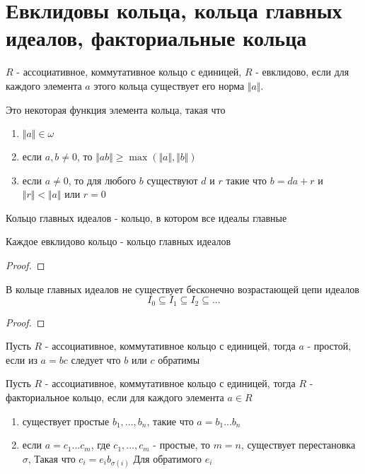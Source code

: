 \documentclass[../main/document.tex]{subfiles}
\begin{document}
\section{Евклидовы кольца, кольца главных идеалов, факториальные кольца}
\begin{dfn}
$R$ - ассоциативное, коммутативное кольцо с единицей, $R$ - евклидово, если для каждого элемента $a$ этого кольца существует его норма $\Vert a\Vert$.
\end{dfn}
\begin{dfn}
Это некоторая функция элемента кольца, такая что
\begin{enumerate}
\item $\Vert a\Vert \in \omega$
\item если $a,b\neq 0$, то $\Vert ab\Vert \geq \max(\Vert a\Vert,\Vert b\Vert)$
\item если $a\neq 0$, то для любого $b$ существуют $d$ и $r$ такие что $b=da+r$ и $\Vert r\Vert < \Vert a\Vert$ или $r=0$
\end{enumerate}
\end{dfn}
\begin{dfn}
Кольцо главных идеалов - кольцо, в котором все идеалы главные
\end{dfn}
\begin{thm}
Каждое евклидово кольцо - кольцо главных идеалов
\begin{proof}

\end{proof}
\end{thm}
\begin{thm}
В кольце главных идеалов не существует бесконечно возрастающей цепи идеалов
$$I_0\subseteq I_1\subseteq I_2\subseteq ...$$
\begin{proof}

\end{proof}
\end{thm}
\begin{dfn}
Пусть $R$ - ассоциативное, коммутативное кольцо с единицей, тогда $a$ - простой, если из $a=bc$ следует что $b$ или $c$ обратимы
\end{dfn}
\begin{dfn}
Пусть $R$ - ассоциативное, коммутативное кольцо с единицей, тогда $R$ - факториальное кольцо, если для каждого элемента $a\in R$
\begin{enumerate}
\item существует простые $b_1,...,b_n$, такие что $a=b_1...b_n$
\item если $a=c_1...c_m$, где $c_1,...,c_m$ - простые, то $m=n$, существует перестановка $\sigma$, Такая что $c_i=e_ib_{\sigma(i)}$ Для обратимого $e_i$
\end{enumerate} 
\end{dfn}
\end{document}
